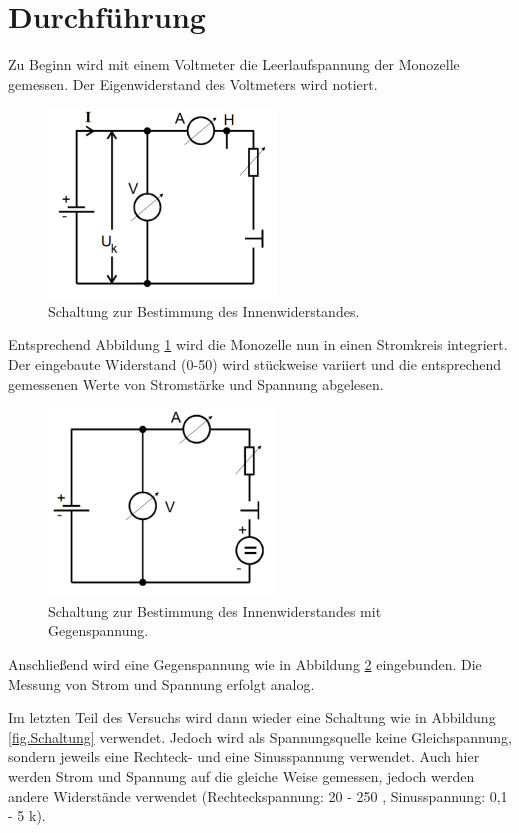 \section{Durchführung}
\label{sec:Durchführung}
Zu Beginn wird mit einem Voltmeter die Leerlaufspannung der Monozelle gemessen.
Der Eigenwiderstand des Voltmeters wird notiert.

\begin{figure}[H]
  \centering
  \includegraphics[height=5cm]{Schaltung.PNG}
  \caption{Schaltung zur Bestimmung des Innenwiderstandes. \cite{sample}}
  \label{fig:Schaltung}
\end{figure}

Entsprechend Abbildung \ref{fig:Schaltung} wird die Monozelle nun in einen
Stromkreis integriert. Der eingebaute Widerstand (0-50\Omega) wird stückweise variiert und
die entsprechend gemessenen Werte von Stromstärke und Spannung abgelesen.

\begin{figure}[H]
  \centering
  \includegraphics[height=5cm]{Schaltung1.PNG}
  \caption{Schaltung zur Bestimmung des Innenwiderstandes mit Gegenspannung. \cite{sample}}
  \label{fig:Schaltung1}
\end{figure}

Anschließend wird eine Gegenspannung wie in Abbildung \ref{fig:Schaltung1}
eingebunden. Die Messung von Strom und Spannung erfolgt analog.

Im letzten Teil des Versuchs wird dann wieder eine Schaltung wie in Abbildung
\ref{fig.Schaltung} verwendet. Jedoch wird als Spannungsquelle keine Gleichspannung,
sondern jeweils eine Rechteck- und eine Sinusspannung verwendet. Auch hier werden
Strom und Spannung auf die gleiche Weise gemessen, jedoch werden andere Widerstände
verwendet (Rechteckspannung: 20 - 250 \Omega, Sinusspannung: 0,1 - 5 k\Omega).

